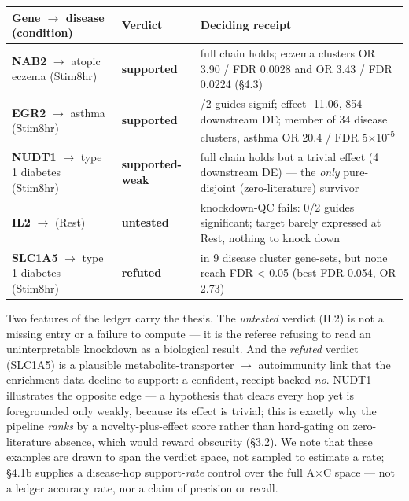 {\def\LTcaptype{none} %
\begin{longtable}[]{@{}
  >{\raggedright\arraybackslash}p{}
  >{\raggedright\arraybackslash}p{}
  >{\raggedright\arraybackslash}p{}@{}}
\toprule\noalign{}
\begin{minipage}[b]{\linewidth}\raggedright
Gene $\rightarrow$ disease (condition)
\end{minipage} & \begin{minipage}[b]{\linewidth}\raggedright
Verdict
\end{minipage} & \begin{minipage}[b]{\linewidth}\raggedright
Deciding receipt
\end{minipage} \\
\midrule\noalign{}
\endhead
\bottomrule\noalign{}
\endlastfoot
\textbf{NAB2} $\rightarrow$ atopic eczema (Stim8hr) & \textbf{supported} & full chain holds; eczema clusters OR 3.90 / FDR 0.0028 and OR 3.43 / FDR 0.0224 (\S{}4.3) \\
\textbf{EGR2} $\rightarrow$ asthma (Stim8hr) & \textbf{supported} & 2/2 guides signif; effect -11.06, 854 downstream DE; member of 34 disease clusters, asthma OR 20.4 / FDR 5$\times$10\textsuperscript{-}\textsuperscript{5} \\
\textbf{NUDT1} $\rightarrow$ type 1 diabetes (Stim8hr) & \textbf{supported-weak} & full chain holds but a trivial effect (4 downstream DE) --- the \emph{only} pure-disjoint (zero-literature) survivor \\
\textbf{IL2} $\rightarrow$ (Rest) & \textbf{untested} & knockdown-QC fails: 0/2 guides significant; target barely expressed at Rest, nothing to knock down \\
\textbf{SLC1A5} $\rightarrow$ type 1 diabetes (Stim8hr) & \textbf{refuted} & in 9 disease cluster gene-sets, but none reach FDR \textless{} 0.05 (best FDR 0.054, OR 2.73) \\
\end{longtable}
}

Two features of the ledger carry the thesis. The \emph{untested} verdict (IL2) is not a missing entry or a
failure to compute --- it is the referee refusing to read an uninterpretable knockdown as a biological
result. And the \emph{refuted} verdict (SLC1A5) is a plausible metabolite-transporter $\rightarrow$ autoimmunity link that
the enrichment data decline to support: a confident, receipt-backed \emph{no}. NUDT1 illustrates the opposite
edge --- a hypothesis that clears every hop yet is foregrounded only weakly, because its effect is trivial;
this is exactly why the pipeline \emph{ranks} by a novelty-plus-effect score rather than hard-gating on
zero-literature absence, which would reward obscurity (\S{}3.2). We note that these examples are drawn to span
the verdict space, not sampled to estimate a rate; \S{}4.1b supplies a disease-hop support-\emph{rate} control over
the full A$\times$C space --- not a ledger accuracy rate, nor a claim of precision or recall.

